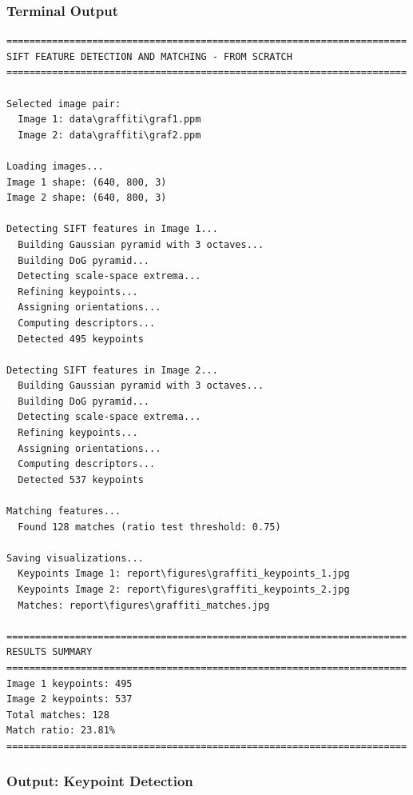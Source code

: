 \documentclass[12pt,a4paper]{article}
\begin{document}
\subsubsection{Terminal Output}
\begin{lstlisting}
======================================================================
SIFT FEATURE DETECTION AND MATCHING - FROM SCRATCH
======================================================================

Selected image pair:
  Image 1: data\graffiti\graf1.ppm
  Image 2: data\graffiti\graf2.ppm

Loading images...
Image 1 shape: (640, 800, 3)
Image 2 shape: (640, 800, 3)

Detecting SIFT features in Image 1...
  Building Gaussian pyramid with 3 octaves...
  Building DoG pyramid...
  Detecting scale-space extrema...
  Refining keypoints...
  Assigning orientations...
  Computing descriptors...
  Detected 495 keypoints

Detecting SIFT features in Image 2...
  Building Gaussian pyramid with 3 octaves...
  Building DoG pyramid...
  Detecting scale-space extrema...
  Refining keypoints...
  Assigning orientations...
  Computing descriptors...
  Detected 537 keypoints

Matching features...
  Found 128 matches (ratio test threshold: 0.75)

Saving visualizations...
  Keypoints Image 1: report\figures\graffiti_keypoints_1.jpg
  Keypoints Image 2: report\figures\graffiti_keypoints_2.jpg
  Matches: report\figures\graffiti_matches.jpg

======================================================================
RESULTS SUMMARY
======================================================================
Image 1 keypoints: 495
Image 2 keypoints: 537
Total matches: 128
Match ratio: 23.81%
======================================================================
\end{lstlisting}

\subsubsection{Output: Keypoint Detection}
\end{document}

